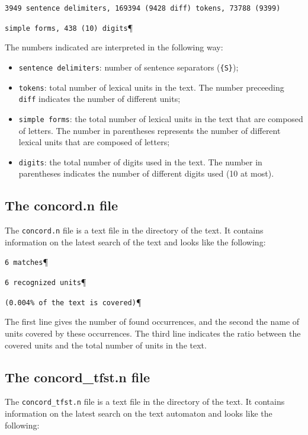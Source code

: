 \bigskip
\verb$3949 sentence delimiters, 169394 (9428 diff) tokens, 73788 (9399)$

\verb$simple forms, 438 (10) digits$\P

\bigskip
\noindent The numbers indicated are interpreted in the following way:
\begin{itemize}
  \item \verb+sentence delimiters+: number of sentence separators
  (\verb+{S}+);

  \item \verb+tokens+: total number of lexical units in the text. The number
  preceeding \verb+diff+ indicates the number of different units;

  \item \verb+simple forms+: the total number of lexical units in the text that
  are composed of letters. The number in parentheses represents the number of
  different lexical units that are composed of letters;

  \item \verb+digits+: the total number of digits used in the text. The number in
  parentheses indicates the number of different digits used (10 at most).

\end{itemize}


\subsection{The concord.n file}
The \verb+concord.n+ file is a text file in the directory of the text. It
contains information on the latest search of the text and looks like the
following:


\bigskip
\verb$6 matches$\P

\verb$6 recognized units$\P

\verb$(0.004% of the text is covered)$\P

\bigskip
\noindent The first line gives the number of found occurrences, and the second the name of
units covered by these occurrences. The third line indicates the ratio between
the covered units and the total number of units in the text.


\subsection{The concord\_tfst.n file}
The \verb+concord_tfst.n+ file is a text file in the directory of the text. It
contains information on the latest search on the text automaton and looks like
the following:

